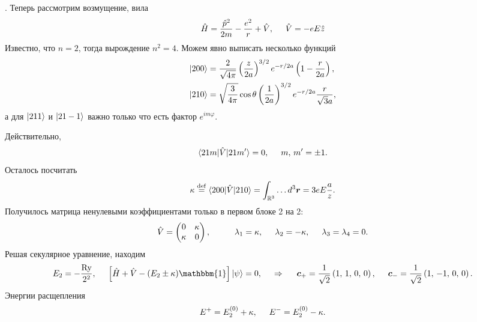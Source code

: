 
.
Теперь рассмотрим возмущение, вила
\begin{equation*}
    \hat{H} = \frac{\hat{p}^2}{2m} - \frac{e^2}{r} + \hat{V},
    \hspace{5 mm} 
    \hat{V} = - e E \hat{z}
\end{equation*}
Известно, что $n=2$, тогда вырождение $n^2 = 4$. Можем явно выписать несколько функций
\begin{align*}
    \left| 200 \right\rangle &= \frac{2}{\sqrt{4 \pi}} \left(\frac{z}{2a}\right)^{3/2} e^{-r/2a} \left(
        1 - \frac{r}{2a}
    \right), \\
    \left| 210 \right\rangle &= \sqrt{\frac{3}{4\pi}} \cos \theta \left(\frac{1}{2a}\right)^{3/2} e^{-r/2a} \frac{r}{\sqrt{3} a}, 
\end{align*}
а для $\left| 211 \right\rangle$ и $\left| 21-1 \right\rangle$ важно только что есть фактор $e^{im\varphi}$.

Действительно,
\begin{equation*}
    \bk{21m}[\hat{V}]{21m'} = 0,
    \hspace{5 mm} 
    m,\, m' = \pm 1.
\end{equation*}
Осталось посчитать
\begin{equation*}
    \kappa \overset{\mathrm{def}}{=}  \bk{200}[\hat{V}]{210} = \int_{\mathbb{R}^3}
        \ldots
    d^3 \vc{r} = 3 e E \frac{a}{z}.
\end{equation*}
Получилось матрица  ненулевыми коэффициентами только в первом блоке 2 на 2:
\begin{equation*}
    \hat{V} = \begin{pmatrix}
        0 & \kappa  \\
        \kappa & 0  \\
    \end{pmatrix},
    \hspace{10 mm} 
    \lambda_1 = \kappa, \hspace{5 mm} 
    \lambda_2 = - \kappa,
    \hspace{5 mm}   
    \lambda_3 =  \lambda_4 = 0.
\end{equation*}
Решая секулярное уравнение, находим
\begin{equation*}
    E_2 =  - \frac{\text{Ry}}{2^2},
    \hspace{5 mm} 
    \left[\hat{H} + \hat{V} - (E_2 \pm \kappa) \mathbbm{1}\right] \ket{\psi} = 0,
    \hspace{0.5cm} \Rightarrow \hspace{0.5cm}
    \vc{c}_+ = \frac{1}{\sqrt{2}} \left(1,\, 1,\, 0,\, 0\right),
    \hspace{5 mm} 
    \vc{c}_- = \frac{1}{\sqrt{2}} \left(1,\, -1,\, 0,\, 0\right).
\end{equation*}
Энергии расщепления
\begin{equation*}
    E^+ = E_2^{(0)} + \kappa,
    \hspace{5 mm} 
    E^- = E_{2}^{(0)} -\kappa.
\end{equation*}


